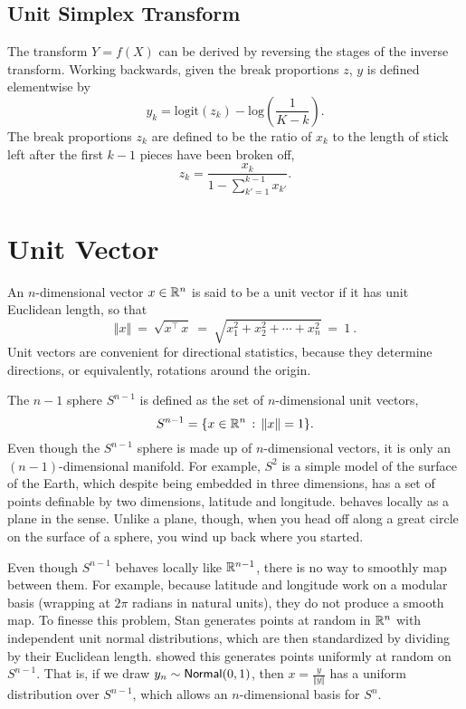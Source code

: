\subsection{Unit Simplex Transform}

The transform $Y = f(X)$ can be derived by reversing the stages of the
inverse transform.  Working backwards, given the break proportions
$z$, $y$ is defined elementwise by
%
\[
y_k
= \mbox{logit}(z_k)
- \mbox{log}\left(
   \frac{1}{K-k}
   \right)
.
\]
%
The break proportions $z_k$ are defined to be the ratio of $x_k$ to
the length of stick left after the first $k-1$ pieces have been broken
off,
%
\[
z_k
= \frac{x_k}
       {1 - \sum_{k' = 1}^{k-1} x_{k'}}
.
\]

\section{Unit Vector}

An $n$-dimensional vector $x \in \reals^n$ is said to be a unit vector
if it has unit Euclidean length, so that
%
\[
\Vert x \Vert 
\ = \ \sqrt{x^{\top}\,x}
\ = \ \sqrt{x_1^2 + x_2^2 + \cdots + x_n^2}
\ = \ 1\ .
\]
%
Unit vectors are convenient for directional statistics, because they
determine directions, or equivalently, rotations around the origin.

The $n-1$ sphere $S^{n-1}$ is defined as the set of $n$-dimensional
unit vectors, 
\[
S^{n-1} = \{ x \in \reals^n \, : \, \Vert x \Vert = 1 \}.
\]
%
Even though the $S^{n-1}$ sphere is made up of $n$-dimensional
vectors, it is only an $(n-1)$-dimensional manifold.  For example, $S^2$
is a simple model of the surface of the Earth, which despite being
embedded in three dimensions, has a set of points definable by two
dimensions, latitude and longitude. behaves locally as a plane in the
sense. Unlike a plane, though, when you head off along a great circle
on the surface of a sphere, you wind up back where you started.

Even though $S^{n-1}$ behaves locally like $\reals^{n-1}$, there is no
way to smoothly map between them. For example, because
latitude and longitude work on a modular basis (wrapping at $2\pi$
radians in natural units), they do not produce a smooth map. To
finesse this problem, Stan generates points at random in $\reals^n$
with independent unit normal distributions, which are then
standardized by dividing by their Euclidean length.
\cite{Marsaglia:1972} showed this generates points uniformly at random
on $S^{n-1}$.  That is, if we draw $y_n \sim \distro{Normal}(0, 1)$,
then $x = \frac{y}{\Vert y \Vert}$ has a uniform distribution over
$S^{n-1}$, which allows an $n$-dimensional basis for $S^n$.



